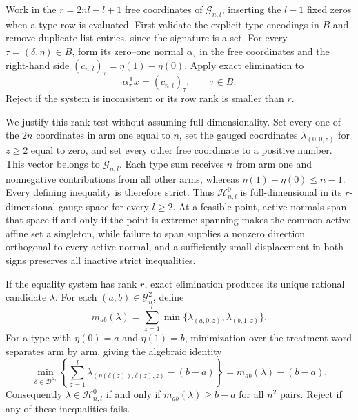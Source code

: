 Work in the \(r=2nl-l+1\) free coordinates of \(\mathcal G_{n,l}\), inserting the \(l-1\) fixed zeros when a type row is evaluated. First validate the explicit type encodings in \(B\) and remove duplicate list entries, since the signature is a set. For every \(\tau=(\delta,\eta)\in B\), form its zero--one normal \(\alpha_\tau\) in the free coordinates and the right-hand side \((c_{n,l})_\tau=\eta(1)-\eta(0)\). Apply exact elimination to
\[\alpha_\tau^{\mathsf T}x=(c_{n,l})_\tau,\qquad \tau\in B.\]
Reject if the system is inconsistent or its row rank is smaller than \(r\).

We justify this rank test without assuming full dimensionality. Set every one of the \(2n\) coordinates in arm one equal to \(n\), set the gauged coordinates \(\lambda_{(0,0,z)}\) for \(z\ge2\) equal to zero, and set every other free coordinate to a positive number. This vector belongs to \(\mathcal G_{n,l}\). Each type sum receives \(n\) from arm one and nonnegative contributions from all other arms, whereas \(\eta(1)-\eta(0)\le n-1\). Every defining inequality is therefore strict. Thus \(\mathcal H^0_{n,l}\) is full-dimensional in its \(r\)-dimensional gauge space for every \(l\ge2\). At a feasible point, active normals span that space if and only if the point is extreme: spanning makes the common active affine set a singleton, while failure to span supplies a nonzero direction orthogonal to every active normal, and a sufficiently small displacement in both signs preserves all inactive strict inequalities.

If the equality system has rank \(r\), exact elimination produces its unique rational candidate \(\lambda\). For each \((a,b)\in\mathcal Y_n^2\), define
\[m_{ab}(\lambda)=\sum_{z=1}^l\min\{\lambda_{(a,0,z)},\lambda_{(b,1,z)}\}.\]
For a type with \(\eta(0)=a\) and \(\eta(1)=b\), minimization over the treatment word separates arm by arm, giving the algebraic identity
\[\min_{\delta\in\mathcal D^{\mathcal Z_l}}\left\{\sum_{z=1}^l\lambda_{(\eta(\delta(z)),\delta(z),z)}-(b-a)\right\}=m_{ab}(\lambda)-(b-a).\]
Consequently \(\lambda\in\mathcal H^0_{n,l}\) if and only if \(m_{ab}(\lambda)\ge b-a\) for all \(n^2\) pairs. Reject if any of these inequalities fails.

